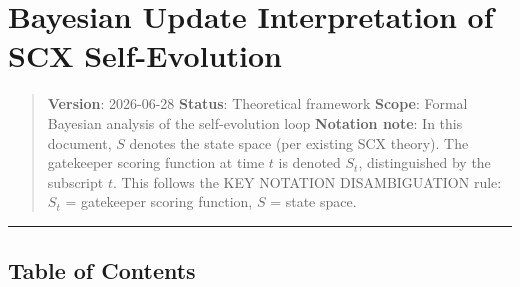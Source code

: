 \documentclass[
  12pt,
]{article}
\author{SCX}
\date{2026}
\begin{document}
\section{Bayesian Update Interpretation of SCX
Self-Evolution}\label{bayesian-update-interpretation-of-scx-self-evolution}

\begin{quote}
\textbf{Version}: 2026-06-28 \textbar{} \textbf{Status}: Theoretical
framework \textbar{} \textbf{Scope}: Formal Bayesian analysis of the
self-evolution loop \textbf{Notation note}: In this document, \(S\)
denotes the state space (per existing SCX theory). The gatekeeper
scoring function at time \(t\) is denoted \(S_t\), distinguished by the
subscript \(t\). This follows the KEY NOTATION DISAMBIGUATION rule:
\(S_t\) = gatekeeper scoring function, \(S\) = state space.
\end{quote}

\begin{center}\rule{0.5\linewidth}{0.5pt}\end{center}

\subsection{Table of Contents}\label{table-of-contents}
\end{document}
